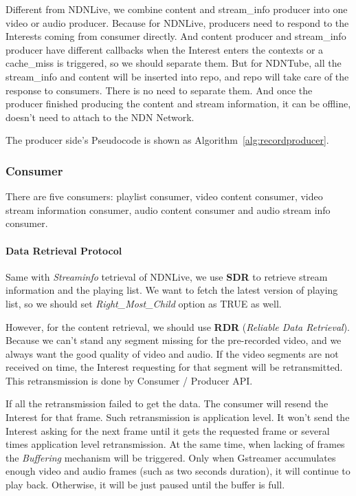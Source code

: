 Different from NDNLive, we combine content and stream\_info producer into one video or audio producer. Because for NDNLive, producers need to respond to the Interests coming from consumer directly. And content producer and stream\_info producer have different callbacks when the Interest enters the contexts or a cache\_miss is triggered, so we should separate them. But for NDNTube, all the stream\_info and content will be inserted into repo, and repo will take care of the response to consumers. There is no need to separate them. And once the producer finished producing the content and stream information, it can be offline, doesn't need to attach to the NDN Network. 

The producer side's Pseudocode is shown as Algorithm~\ref{alg:recordproducer}.

\subsubsection{Consumer}

There are five consumers: playlist consumer, video content consumer, video stream information consumer, audio content consumer and audio stream info consumer.

\paragraph{Data Retrieval Protocol} %
\label{par:ndntube_data_retrieval}

Same with \textit{Streaminfo} tetrieval of NDNLive, we use \textbf{SDR} to retrieve stream information and the playing list. We want to fetch the latest version of playing list, so we should set \textit{Right\_Most\_Child} option as TRUE as well.

However, for the content retrieval, we should use \textbf{RDR} (\textit{Reliable Data Retrieval}). Because we can't stand any segment missing for the pre-recorded video, and we always want the good quality of video and audio. If the video segments are not received on time, the Interest requesting for that segment will be retransmitted. This retransmission is done by Consumer / Producer API. 

If all the retransmission failed to get the data. The consumer will resend the Interest for that frame. Such retransmission is application level. It won't send the Interest asking for the next frame until it gets the requested frame or several times application level retransmission. At the same time, when lacking of frames the \textit{Buffering} mechanism will be triggered. Only when Gstreamer accumulates enough video and audio frames (such as two seconds duration), it will continue to play back. Otherwise, it will be just paused until the buffer is full.


